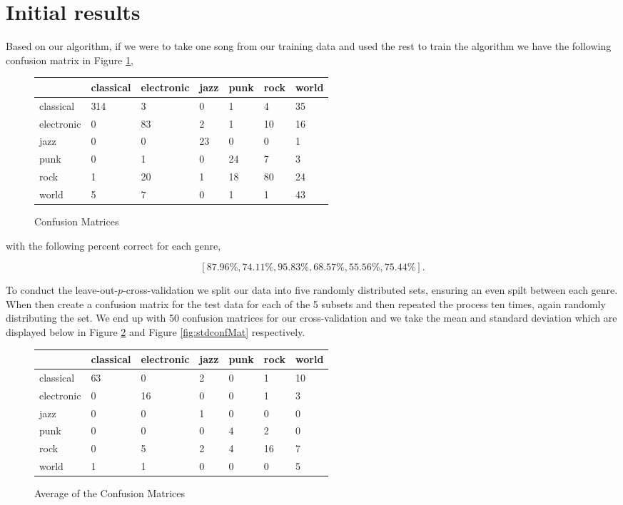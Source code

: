 \documentclass[12pt]{article}
\begin{document}
\section{Initial results}
Based on our algorithm, if we were to take one song from our training data and used the rest to train the algorithm we have the  following confusion matrix  in Figure {\ref{fig:confMat}}, \begin{figure}[h!]
\centering
 \begin{tabular}{l| |l | l | l | l | l | l | }
&classical &electronic& jazz &punk& rock &world \\ \hline \hline
classical& 314 & 3 & 0 & 1 & 4 & 35 \\ \hline 
electronic&0 & 83 & 2 & 1 & 10 & 16 \\ \hline 
jazz&0 & 0 & 23 & 0 & 0 & 1 \\ \hline 
punk& 0 & 1 & 0 & 24 & 7 & 3 \\ \hline 
rock&1 & 20 & 1 & 18 & 80 & 24 \\ \hline 
world&5 & 7 & 0 & 1 & 1 & 43 \\ \hline 
\end{tabular}
\caption{Confusion Matrices}
\label{fig:confMat}
\end{figure}

with the following percent correct for each genre, 

\[  [87.96\%, 74.11\%, 95.83\%, 68.57\%, 55.56\%, 75.44\% ]. \]


To conduct the leave-out-$p$-cross-validation we split our data into five randomly distributed sets, ensuring an even spilt between each genre. When then create a confusion matrix for the test data for each of the 5 subsets and then repeated the process ten times, again randomly distributing the set. We end up with 50 confusion matrices for our cross-validation and we take the mean and standard deviation which are displayed below in Figure {\ref{fig:avgconfMat}}  and Figure {\ref{fig:stdconfMat}} respectively.
\begin{figure}[h!]
\centering
 \begin{tabular}{l| |l | l | l | l | l | l | }
&classical &electronic& jazz &punk& rock &world \\ \hline \hline
classical&63 & 0 & 2 & 0 & 1 & 10 \\ \hline 
electronic&0 & 16 & 0 & 0 & 1 & 3 \\ \hline 
jazz&0 & 0 & 1 & 0 & 0 & 0 \\ \hline 
punk&0 & 0 & 0 & 4 & 2 & 0 \\ \hline 
rock&0 & 5 & 2 & 4 & 16 & 7 \\ \hline 
world&1 & 1 & 0 & 0 & 0 & 5 \\ \hline 
\end{tabular}
\caption{Average of the Confusion Matrices} 
\label{fig:avgconfMat}
\end{figure}
\end{document}
